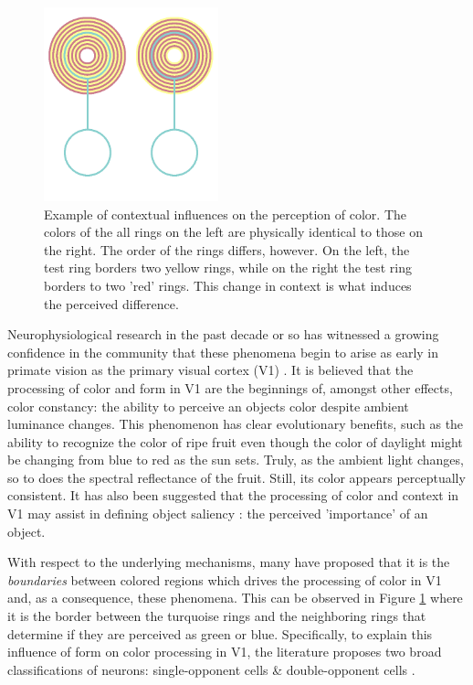 \documentclass[journal,onecolumn]{IEEEtran}
\begin{document}
\begin{figure}[H]
    \center
    \includegraphics[width=0.45\textwidth]{test-circle-a-reference}
    \caption{Example of contextual influences on the perception of color. The colors of the all rings on the left are physically identical to those on the right. The order of the rings differs, however. On the left, the test ring borders two yellow rings, while on the right the test ring borders to two 'red' rings. This change in context is what induces the perceived difference.}
    \label{fig:example}
\end{figure}

\newpage

Neurophysiological research in the past decade or so has witnessed a growing confidence in the community that these phenomena begin to arise as early in primate vision as the primary visual cortex (V1) \cite{conway:2010, johnson:2008, schluppeck:2002, sincich:2005, solomon:2007, shapley:2011}. It is believed that the processing of color and form in V1 are the beginnings of, amongst other effects, color constancy: the ability to perceive an objects color despite ambient luminance changes. This phenomenon has clear evolutionary benefits, such as the ability to recognize the color of ripe fruit even though the color of daylight might be changing from blue to red as the sun sets. Truly, as the ambient light changes, so to does the spectral reflectance of the fruit. Still, its color appears perceptually consistent. It has also been suggested that the processing of color and context in V1 may assist in defining object saliency \cite{li:2002}: the perceived 'importance' of an object.

With respect to the underlying mechanisms, many have proposed that it is the \textit{boundaries} between colored regions which drives the processing of color in V1 \cite{conway:2010, johnson:2008, schluppeck:2002, sincich:2005, solomon:2007, shapley:2011} and, as a consequence, these phenomena. This can be observed in Figure \ref{fig:example} where it is the border between the turquoise rings and the neighboring rings that determine if they are perceived as green or blue. Specifically, to explain this influence of form on color processing in V1, the literature proposes two broad classifications of neurons: single-opponent cells \& double-opponent cells \cite{johnson:2008}.
\end{document}
